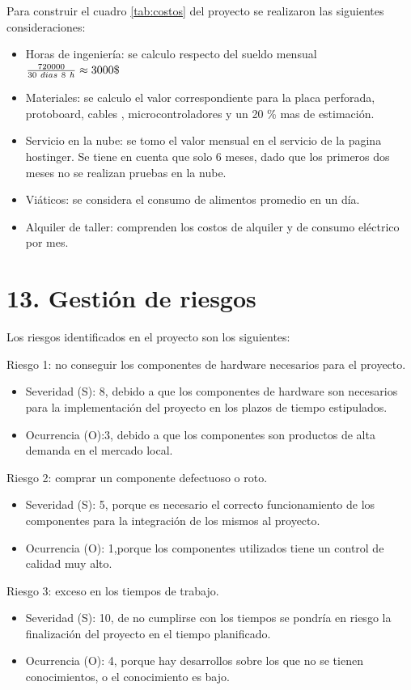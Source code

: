 \documentclass[
11pt, %
]{charter}
\begin{document}
Para construir el cuadro \ref{tab:costos} del proyecto se realizaron las siguientes consideraciones:

\begin{itemize}
\item Horas de ingeniería: se calculo respecto del sueldo  mensual  $\frac{720000}{30\  dias\ \* 8\ h } \approx 3000\$ $
\item Materiales: se calculo el valor correspondiente para la placa perforada, protoboard, cables , microcontroladores y un 20 \% mas de estimación.
\item Servicio en la nube: se tomo el valor mensual en el servicio de la pagina hostinger. Se tiene en cuenta que solo 6 meses, dado que los primeros dos meses no se realizan pruebas en la nube.
\item Viáticos: se considera el consumo de alimentos promedio en un día.
\item Alquiler de taller: comprenden los costos de alquiler y de consumo eléctrico por mes.
\end{itemize}


\section{13. Gestión de riesgos}
\label{sec:riesgos}

Los riesgos identificados en el proyecto son los siguientes:


Riesgo 1: no conseguir los componentes de hardware necesarios  para el proyecto.
\begin{itemize}
	\item Severidad (S): 8, debido a que los componentes de hardware son necesarios para la implementación del proyecto en los plazos de tiempo estipulados. 
	\item Ocurrencia (O):3, debido a que los componentes son productos de alta demanda en el mercado local.
\end{itemize}

Riesgo 2: comprar un componente defectuoso o roto.
\begin{itemize}
	\item Severidad (S): 5, porque es necesario el correcto funcionamiento de los componentes  para la integración de los mismos al proyecto.
	\item Ocurrencia (O): 1,porque los componentes utilizados tiene un control de calidad muy alto.
\end{itemize}

Riesgo 3: exceso en los tiempos de trabajo.
\begin{itemize}
	\item Severidad (S): 10, de no cumplirse con los tiempos se pondría en riesgo la finalización del proyecto en el tiempo planificado. 
	\item Ocurrencia (O): 4, porque hay desarrollos sobre los que no se tienen conocimientos, o el conocimiento es bajo.
\end{itemize}
\end{document}
